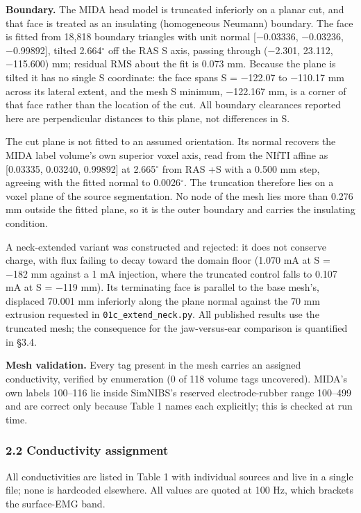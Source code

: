 \documentclass[
  11pt,
]{article}
\newcounter{none} %
\begin{document}
\textbf{Boundary.} The MIDA head model is truncated inferiorly on a planar cut, and
that face is treated as an insulating (homogeneous Neumann) boundary. The face is
fitted from 18,818 boundary triangles with unit normal {[}−0.03336, −0.03236,
−0.99892{]}, tilted 2.664\(^{\circ}\) off the RAS S axis, passing through (−2.301, 23.112,
−115.600) mm; residual RMS about the fit is 0.073 mm. Because the plane is
tilted it has no single S coordinate: the face spans S = −122.07 to −110.17 mm
across its lateral extent, and the mesh S minimum, −122.167 mm, is a corner of
that face rather than the location of the cut. All boundary clearances reported
here are perpendicular distances to this plane, not differences in S.

The cut plane is not fitted to an assumed orientation. Its normal recovers the
MIDA label volume's own superior voxel axis, read from the NIfTI affine as
{[}0.03335, 0.03240, 0.99892{]} at 2.665\(^{\circ}\) from RAS +S with a 0.500 mm step, agreeing
with the fitted normal to 0.0026\(^{\circ}\). The truncation therefore lies on a voxel plane
of the source segmentation. No node of the mesh lies more than 0.276 mm outside
the fitted plane, so it is the outer boundary and carries the insulating
condition.

A neck-extended variant was constructed and rejected: it does not conserve
charge, with flux failing to decay toward the domain floor (1.070 mA at S =
−182 mm against a 1 mA injection, where the truncated control falls to 0.107 mA
at S = −119 mm). Its terminating face is parallel to the base mesh's, displaced
70.001 mm inferiorly along the plane normal against the 70 mm extrusion
requested in \texttt{01c\_extend\_neck.py}. All published results use the truncated mesh;
the consequence for the jaw-versus-ear comparison is quantified in §3.4.

\textbf{Mesh validation.} Every tag present in the mesh carries an assigned
conductivity, verified by enumeration (0 of 118 volume tags uncovered). MIDA's
own labels 100--116 lie inside SimNIBS's reserved electrode-rubber range 100--499
and are correct only because Table 1 names each explicitly; this is checked at
run time.

\subsubsection{2.2 Conductivity assignment}\label{conductivity-assignment}

All conductivities are listed in Table 1 with individual sources and live in a
single file; none is hardcoded elsewhere. All values are quoted at 100 Hz, which
brackets the surface-EMG band.
\end{document}
